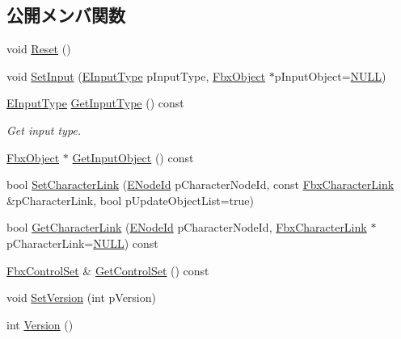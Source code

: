 \subsection*{公開メンバ関数}
\begin{DoxyCompactItemize}
\item 
void \hyperlink{class_fbx_character_a1ee11d659b9fb685b13018d1df9c2dd5}{Reset} ()
\item 
void \hyperlink{class_fbx_character_ab87ed5f986b701e71c9c48974004a340}{Set\+Input} (\hyperlink{class_fbx_character_a0c2ca4f8cab9c76a83b0e207f3ae8ea1}{E\+Input\+Type} p\+Input\+Type, \hyperlink{class_fbx_object}{Fbx\+Object} $\ast$p\+Input\+Object=\hyperlink{fbxarch_8h_a070d2ce7b6bb7e5c05602aa8c308d0c4}{N\+U\+LL})
\item 
\hyperlink{class_fbx_character_a0c2ca4f8cab9c76a83b0e207f3ae8ea1}{E\+Input\+Type} \hyperlink{class_fbx_character_ae4404d380579722e4297cee338e5c33c}{Get\+Input\+Type} () const
\begin{DoxyCompactList}\small\item\em Get input type. \end{DoxyCompactList}\item 
\hyperlink{class_fbx_object}{Fbx\+Object} $\ast$ \hyperlink{class_fbx_character_ab5c94f8151be5c32de9ac489e42e6a43}{Get\+Input\+Object} () const
\item 
bool \hyperlink{class_fbx_character_a8ead498579d0c9aa560e59042ccd36a9}{Set\+Character\+Link} (\hyperlink{class_fbx_character_ad75bf42026e435ac0ff4d7ece2317be4}{E\+Node\+Id} p\+Character\+Node\+Id, const \hyperlink{class_fbx_character_link}{Fbx\+Character\+Link} \&p\+Character\+Link, bool p\+Update\+Object\+List=true)
\item 
bool \hyperlink{class_fbx_character_a556ef97158eecdedc32ba8175943d637}{Get\+Character\+Link} (\hyperlink{class_fbx_character_ad75bf42026e435ac0ff4d7ece2317be4}{E\+Node\+Id} p\+Character\+Node\+Id, \hyperlink{class_fbx_character_link}{Fbx\+Character\+Link} $\ast$p\+Character\+Link=\hyperlink{fbxarch_8h_a070d2ce7b6bb7e5c05602aa8c308d0c4}{N\+U\+LL}) const
\item 
\hyperlink{class_fbx_control_set}{Fbx\+Control\+Set} \& \hyperlink{class_fbx_character_a2810556535144497747222c7e36a2f4b}{Get\+Control\+Set} () const
\item 
void \hyperlink{class_fbx_character_a551e6c63221243de69f196092f2cca04}{Set\+Version} (int p\+Version)
\item 
int \hyperlink{class_fbx_character_ac043c84d80802eb45a29745d20fbd2a0}{Version} ()
\item 

\end{DoxyCompactItemize}
